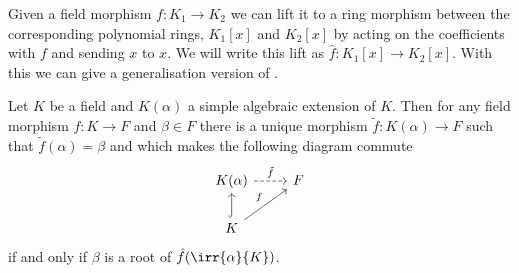 \documentclass[12pt,oneside]{book}
\begin{document}
\parbreak

Given a field morphism \( f \colon K_1 \to K_2 \) we can lift it to a ring morphism
between the corresponding polynomial rings, \( K_1[x] \) and \( K_2[x] \) by acting on the
coefficients with \( f \) and sending \( x \) to \( x \). We will write this lift as \(
\hat{f} \colon K_1[x] \to K_2[x] \). With this we can give a generalisation version of
.
\begin{lemma}\label{lemma:extension lemma II}
	Let \( K \) be a field and \( K(\alpha) \) a simple algebraic extension of \( K \). Then
	for any field morphism \( f \colon K \to F \) and \( \beta \in F \) there is a unique
	morphism \( \tilde{f} \colon K(\alpha) \to F \) such that \( \tilde{f}(\alpha) = \beta
	\) and which makes the following diagram commute
	\begin{equation*}
		\begin{tikzcd}
			K(\alpha) \arrow[r, dashed, "\tilde{f}"] & F \\
			K \arrow[u, hook] \arrow[ru, "f"] & 
		\end{tikzcd}
	\end{equation*}
	if and only if \( \beta \) is a root of \( \hat{f}(\irr{\alpha}{K}) \).
\end{lemma}
\end{document}
